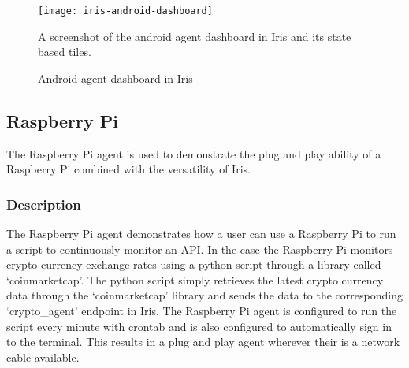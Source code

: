 \documentclass[12pt,a4paper,titlepage]{report}
\begin{document}
\begin{figure}[H]
\begin{tcolorbox}
\begin{center}
\texttt{[image: iris-android-dashboard]}
\end{center}
A screenshot of the android agent dashboard in Iris and its state based tiles.
\end{tcolorbox}
\caption{Android agent dashboard in Iris}
\end{figure}


\subsection{Raspberry Pi}
The Raspberry Pi agent is used to demonstrate the plug and play ability of a Raspberry Pi combined with the versatility of Iris.

\subsubsection{Description}
The Raspberry Pi agent demonstrates how a user can use a Raspberry Pi to run a script to continuously monitor an API. In the case the Raspberry Pi monitors crypto currency exchange rates using a python script through a library called `coinmarketcap'. The python script simply retrieves the latest crypto currency data through the `coinmarketcap' library and sends the data to the corresponding `crypto\_agent' endpoint in Iris. The Raspberry Pi agent is configured to run the script every minute with crontab and is also configured to automatically sign in to the terminal. This results in a plug and play agent wherever their is a network cable available.
\end{document}
